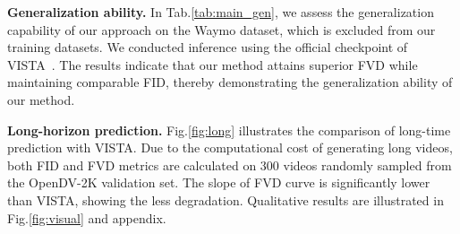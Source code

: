 \noindent \textbf{Generalization ability.}
In Tab.\ref{tab:main_gen}, we assess the generalization capability of our approach on the Waymo dataset, which is excluded from our training datasets. We conducted inference using the official checkpoint of VISTA~\cite{vista}. The results indicate that our method attains superior FVD while maintaining comparable FID, thereby demonstrating the generalization ability of our method.

\noindent \textbf{Long-horizon prediction.}
Fig.\ref{fig:long} illustrates the comparison of long-time prediction with VISTA. Due to the computational cost of generating long videos, both FID and FVD metrics are calculated on 300 videos randomly sampled from the OpenDV-2K validation set. The slope of FVD curve is significantly lower than VISTA, showing the less degradation. Qualitative results are illustrated in Fig.\ref{fig:visual} and appendix.






